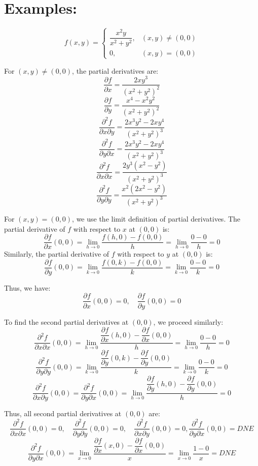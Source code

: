 \documentclass[a4paper,12pt,openany]{book}
\newcommand{\pd}[2]{\dfrac{\partial #1}{\partial #2}}
\newcommand{\pdm}[3]{\dfrac{\partial^2 #1}{\partial #2 \partial #3}}
\begin{document}
\section{Examples:}
\[
    f(x, y) = 
    \begin{cases}
        \dfrac{x^2 y}{x^2 + y^2}, & (x, y) \neq (0, 0)\\
        0, & (x, y) = (0, 0)
    \end{cases}
\]

For \( (x, y) \neq (0, 0) \), the partial derivatives are:
\[
    \pd{f}{x} = \dfrac{2xy^3}{(x^2 + y^2)^2}
\]
\[
    \pd{f}{y} = \dfrac{x^4 - x^2 y^2}{(x^2 + y^2)^2}
\]
\[
    \pdm{f}{x}{y} = \dfrac{2x^3 y^2 - 2x y^4}{(x^2 + y^2)^3}
\]
\[
    \pdm{f}{y}{x} = \dfrac{2x^3 y^2 - 2x y^4}{(x^2 + y^2)^3}
\]
\[
    \pdm{f}{x}{x} = \dfrac{2y^3(x^2 - y^2)}{(x^2 + y^2)^3}
\]
\[
    \pdm{f}{y}{y} = \dfrac{x^2(2x^2 - y^2)}{(x^2 + y^2)^3}
\]

For \( (x, y) = (0, 0) \), we use the limit definition of partial derivatives. The partial derivative of \( f \) with respect to \( x \) at \( (0, 0) \) is:
\[
    \pd{f}{x}(0, 0) = \lim_{h \to 0} \dfrac{f(h, 0) - f(0, 0)}{h} = \lim_{h \to 0} \dfrac{0 - 0}{h} = 0
\]
Similarly, the partial derivative of \( f \) with respect to \( y \) at \( (0, 0) \) is:
\[
    \pd{f}{y}(0, 0) = \lim_{k \to 0} \dfrac{f(0, k) - f(0, 0)}{k} = \lim_{k \to 0} \dfrac{0 - 0}{k} = 0
\]

Thus, we have:
\[
    \pd{f}{x}(0, 0) = 0, \quad \pd{f}{y}(0, 0) = 0
\]

To find the second partial derivatives at \( (0, 0) \), we proceed similarly:
\[
    \pdm{f}{x}{x}(0, 0) = \lim_{h \to 0} \dfrac{\pd{f}{x}(h, 0) - \pd{f}{x}(0, 0)}{h} = \lim_{h \to 0} \dfrac{0 - 0}{h} = 0
\]
\[
    \pdm{f}{y}{y}(0, 0) = \lim_{k \to 0} \dfrac{\pd{f}{y}(0, k) - \pd{f}{y}(0, 0)}{k} = \lim_{k \to 0} \dfrac{0 - 0}{k} = 0
\]
\[
    \pdm{f}{x}{y}(0, 0) = \pdm{f}{y}{x}(0, 0) = \lim_{h \to 0} \dfrac{\pd{f}{y}(h, 0) - \pd{f}{y}(0, 0)}{h} = 0
\]

Thus, all second partial derivatives at \( (0, 0) \) are:
\[
    \pdm{f}{x}{x}(0, 0) = 0, \quad \pdm{f}{y}{y}(0, 0) = 0, \quad \pdm{f}{x}{y}(0, 0) = 0, \pdm{f}{y}{x}(0, 0) = DNE
\]
\[
    \pdm{f}{y}{x}(0, 0) = 
    \lim_{x\to 0} \dfrac{\pd{f}{x}(x, 0) - \pd{f}{x}(0, 0)}{x} = \lim_{x\to 0} \dfrac{1 - 0}{x} = DNE
\]
\end{document}
